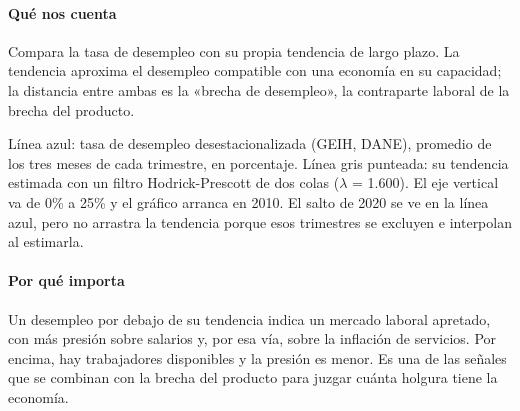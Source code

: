 \paragraph{Qué nos cuenta}
Compara la tasa de desempleo con su propia tendencia de largo plazo. La tendencia aproxima el desempleo compatible con una economía en su capacidad; la distancia entre ambas es la «brecha de desempleo», la contraparte laboral de la brecha del producto.

\begin{leer}
Línea azul: tasa de desempleo desestacionalizada (GEIH, DANE), promedio de los tres meses de cada trimestre, en porcentaje. Línea gris punteada: su tendencia estimada con un filtro Hodrick-Prescott de dos colas ($\lambda$ = 1.600). El eje vertical va de 0\% a 25\% y el gráfico arranca en 2010. El salto de 2020 se ve en la línea azul, pero no arrastra la tendencia porque esos trimestres se excluyen e interpolan al estimarla.
\end{leer}

\paragraph{Por qué importa}
Un desempleo por debajo de su tendencia indica un mercado laboral apretado, con más presión sobre salarios y, por esa vía, sobre la inflación de servicios. Por encima, hay trabajadores disponibles y la presión es menor. Es una de las señales que se combinan con la brecha del producto para juzgar cuánta holgura tiene la economía.

